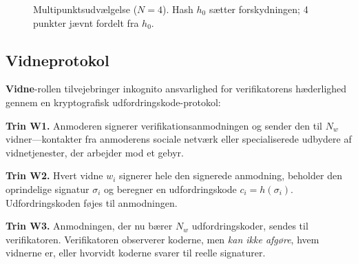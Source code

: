 \documentclass[11pt,a4paper,twocolumn]{article}
\begin{document}
\begin{figure}[ht]
\centering
{}
\caption{Multipunktsudvælgelse ($N{=}4$). Hash $h_0$ sætter forskydningen; 4 punkter jævnt fordelt fra $h_0$.}
\label{fig:multipoint}
\end{figure}

\subsection{Vidneprotokol}

\textbf{Vidne}-rollen tilvejebringer inkognito ansvarlighed for verifikatorens hæderlighed gennem en kryptografisk udfordringskode-protokol:

\textbf{Trin W1.} Anmoderen signerer verifikationsanmodningen og sender den til $N_w$ vidner---kontakter fra anmoderens sociale netværk eller specialiserede udbydere af vidnetjenester, der arbejder mod et gebyr.

\textbf{Trin W2.} Hvert vidne $w_i$ signerer hele den signerede anmodning, beholder den oprindelige signatur $\sigma_i$ og beregner en udfordringskode $c_i = h(\sigma_i)$. Udfordringskoden føjes til anmodningen.

\textbf{Trin W3.} Anmodningen, der nu bærer $N_w$ udfordringskoder, sendes til verifikatoren. Verifikatoren observerer koderne, men \emph{kan ikke afgøre}, hvem vidnerne er, eller hvorvidt koderne svarer til reelle signaturer.
\end{document}
